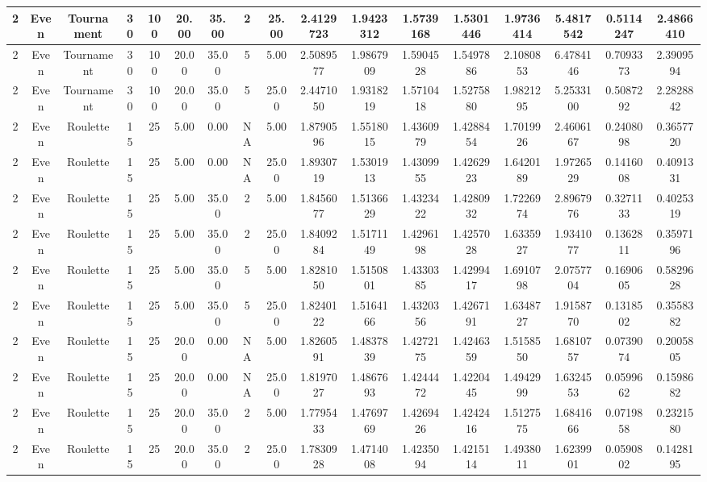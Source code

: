 \documentclass[a4paper]{article}
\begin{document}
\begin{center}
\begin{tabular}{ | c | c | c | c | c | c | c | c | c | c | c | c | c | c | c | c | c | }
		\hline
		2	&	Even	&	Tournament	&	30	&	100	&	20.00	&	35.00	&	2	&	25.00	&	2.4129723	&	1.9423312	&	1.5739168	&	1.5301446	&	1.9736414	&	5.4817542	&	0.5114247	&	2.4866410 \\
		\hline
		2	&	Even	&	Tournament	&	30	&	100	&	20.00	&	35.00	&	5	&	5.00	&	2.5089577	&	1.9867909	&	1.5904528	&	1.5497886	&	2.1080853	&	6.4784146	&	0.7093373	&	2.3909594 \\
		\hline
		2	&	Even	&	Tournament	&	30	&	100	&	20.00	&	35.00	&	5	&	25.00	&	2.4471050	&	1.9318219	&	1.5710418	&	1.5275880	&	1.9821295	&	5.2533100	&	0.5087292	&	2.2828842 \\
		\hline
		2	&	Even	&	Roulette	&	15	&	25	&	5.00	&	0.00	&	NA	&	5.00	&	1.8790596	&	1.5518015	&	1.4360979	&	1.4288454	&	1.7019926	&	2.4606167	&	0.2408098	&	0.3657720 \\
		\hline
		2	&	Even	&	Roulette	&	15	&	25	&	5.00	&	0.00	&	NA	&	25.00	&	1.8930719	&	1.5301913	&	1.4309955	&	1.4262923	&	1.6420189	&	1.9726529	&	0.1416008	&	0.4091331 \\
		\hline
		2	&	Even	&	Roulette	&	15	&	25	&	5.00	&	35.00	&	2	&	5.00	&	1.8456077	&	1.5136629	&	1.4323422	&	1.4280932	&	1.7226974	&	2.8967976	&	0.3271133	&	0.4025319 \\
		\hline
		2	&	Even	&	Roulette	&	15	&	25	&	5.00	&	35.00	&	2	&	25.00	&	1.8409284	&	1.5171149	&	1.4296198	&	1.4257028	&	1.6335927	&	1.9341077	&	0.1362811	&	0.3597196 \\
		\hline
		2	&	Even	&	Roulette	&	15	&	25	&	5.00	&	35.00	&	5	&	5.00	&	1.8281050	&	1.5150801	&	1.4330385	&	1.4299417	&	1.6910798	&	2.0757704	&	0.1690605	&	0.5829628 \\
		\hline
		2	&	Even	&	Roulette	&	15	&	25	&	5.00	&	35.00	&	5	&	25.00	&	1.8240122	&	1.5164166	&	1.4320356	&	1.4267191	&	1.6348727	&	1.9158770	&	0.1318502	&	0.3558382 \\
		\hline
		2	&	Even	&	Roulette	&	15	&	25	&	20.00	&	0.00	&	NA	&	5.00	&	1.8260591	&	1.4837839	&	1.4272175	&	1.4246359	&	1.5158550	&	1.6810757	&	0.0739074	&	0.2005805 \\
		\hline
		2	&	Even	&	Roulette	&	15	&	25	&	20.00	&	0.00	&	NA	&	25.00	&	1.8197027	&	1.4867693	&	1.4244472	&	1.4220445	&	1.4942999	&	1.6324553	&	0.0599662	&	0.1598682 \\
		\hline
		2	&	Even	&	Roulette	&	15	&	25	&	20.00	&	35.00	&	2	&	5.00	&	1.7795433	&	1.4769769	&	1.4269426	&	1.4242416	&	1.5127575	&	1.6841666	&	0.0719858	&	0.2321580 \\
		\hline
		2	&	Even	&	Roulette	&	15	&	25	&	20.00	&	35.00	&	2	&	25.00	&	1.7830928	&	1.4714008	&	1.4235094	&	1.4215114	&	1.4938011	&	1.6239901	&	0.0590802	&	0.1428195 \\

\end{tabular}
\end{center}
\end{document}
